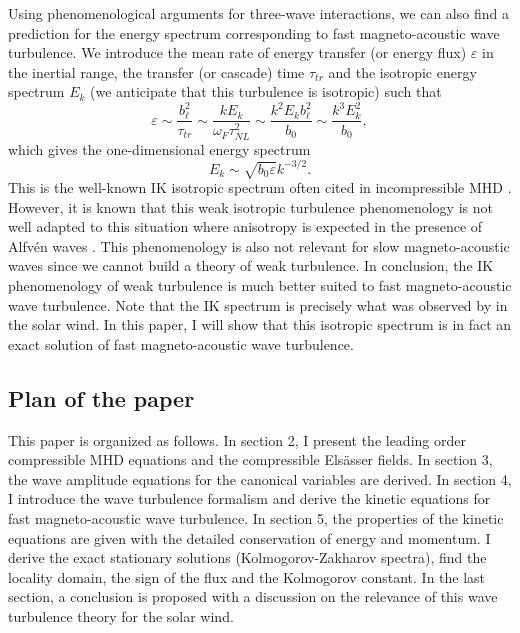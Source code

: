 \documentclass{jpp}
\newcommand{\red}[1]{}
\def\be{\begin{equation}}
\def\ee{\end{equation}}
\begin{document}
Using phenomenological arguments for three-wave interactions, we can also find a prediction for the energy spectrum corresponding to fast magneto-acoustic wave turbulence. We introduce the mean rate of energy transfer (or energy flux) $\varepsilon$ in the inertial range, the transfer (or cascade) time $\tau_{tr}$ and the isotropic energy spectrum $E_k$ (we anticipate that this turbulence is isotropic) such that
\be
\varepsilon \sim \frac{b^2_\ell}{\tau_{tr}} \sim \frac{kE_k}{\omega_F \tau_{NL}^2} \sim \frac{k^2 E_k b^2_\ell}{b_0} \sim \frac{k^3 E^2_k}{b_0} ,
\ee
which gives the one-dimensional energy spectrum
\be
E_k \sim \sqrt{b_0 \varepsilon} k^{-3/2} .
\ee
This is the well-known IK isotropic spectrum \citep{Iroshnikov64,Kraichnan65} often cited in incompressible MHD 
\red{(with the same type of phenomenology -- or dimensional analysis -- a $k^{-3/2}$ energy spectrum can also be found in acoustic wave turbulence \citep{Zakharov1970})}.
However, it is known that this weak isotropic turbulence phenomenology is not well adapted to this situation where anisotropy is expected in the presence of Alfv\'en waves \citep{Galtier2000}. This phenomenology is also not relevant for slow magneto-acoustic waves since we cannot build a theory of weak turbulence. In conclusion, the IK phenomenology of weak turbulence is much better suited to fast magneto-acoustic wave turbulence. Note that the IK spectrum is precisely what was observed by \cite{Zhao2022b} in the solar wind. In this paper, I will show that this isotropic spectrum is in fact an exact solution of fast magneto-acoustic wave turbulence.


\subsection{Plan of the paper}
This paper is organized as follows. In section 2, I present the leading order compressible MHD equations and the compressible Els\"asser fields. In section 3, the wave amplitude equations for the canonical variables are derived. In section 4, I introduce the wave turbulence formalism and derive the kinetic equations for fast magneto-acoustic wave turbulence. In section 5, the properties of the kinetic equations are given with the detailed conservation of energy and momentum. I derive the exact stationary solutions (Kolmogorov-Zakharov spectra), find the locality domain, the sign of the flux and the Kolmogorov constant. In the last section, a conclusion is proposed with a discussion on the relevance of this wave turbulence theory for the solar wind. 
\end{document}

